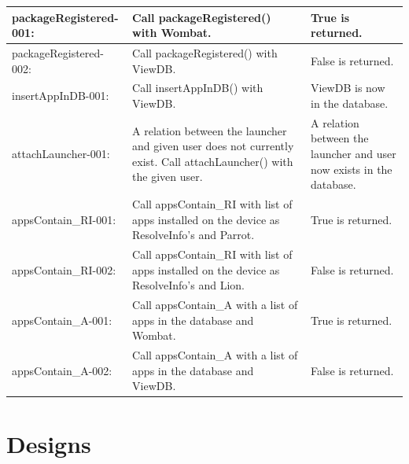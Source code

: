 \begin{table}[ht]
\centering  %
\begin{tabular}{| p{1.7in} | p{1.7in} | p{1.7in} |}
\hline  
packageRegistered-001: & Call packageRegistered() with Wombat. & True is returned. \\ \hline 
packageRegistered-002: & Call packageRegistered() with ViewDB. & False is returned. \\ \hline 
insertAppInDB-001: & Call insertAppInDB() with ViewDB. & ViewDB is now in the database. \\ \hline 
attachLauncher-001: & A relation between the launcher and given user does not currently exist. Call attachLauncher() with the given user. & A relation between the launcher and user now exists in the database. \\ \hline 
appsContain\_{}RI-001: & Call appsContain\_{}RI with list of apps installed on the device as ResolveInfo's and Parrot. & True is returned. \\ \hline 
appsContain\_{}RI-002: & Call appsContain\_{}RI with list of apps installed on the device as ResolveInfo's and Lion. & False is returned. \\ \hline 
appsContain\_{}A-001: & Call appsContain\_{}A with a list of apps in the database and Wombat. & True is returned. \\ \hline 
appsContain\_{}A-002: & Call appsContain\_{}A with a list of apps in the database and ViewDB. & False is returned. \\ [1ex] 
\hline %
\end{tabular}
\end{table}

\chapter{Designs}
